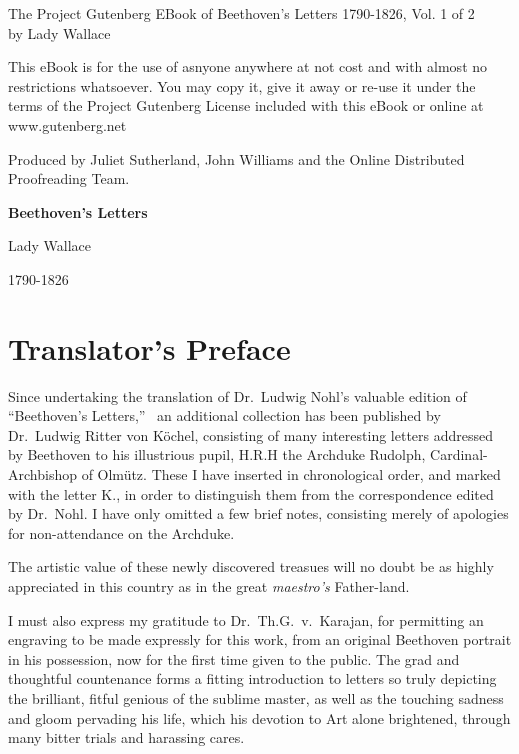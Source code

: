 \documentclass[12pt,oneside]{book}
\begin{document}
    
\frontmatter

\noindent The Project Gutenberg EBook of Beethoven's Letters 1790-1826, Vol. 1 of 2 \\
by Lady Wallace

This eBook is for the use of asnyone anywhere at not cost and with almost no restrictions whatsoever. 
You may copy it, give it away or re-use it under the terms of the Project Gutenberg License included with this eBook or online at www.gutenberg.net

Produced by Juliet Sutherland, John Williams and the Online Distributed Proofreading Team.

\begin{titlepage}
    \centering
    \vspace*{4cm}
    {\Huge \textbf{Beethoven's Letters} \par}
    \vspace{2cm}
    {\LARGE Lady Wallace \par}
    \vspace{1cm}
    {\large 1790-1826 \par }
\end{titlepage}

\chapter{Translator's Preface}
Since undertaking the translation of Dr.~Ludwig Nohl's valuable edition of ``Beethoven's Letters,''~
an additional collection has been published by Dr.~Ludwig Ritter von K\"ochel,
consisting of many interesting letters addressed by Beethoven to his illustrious pupil, H.R.H the Archduke Rudolph,
Cardinal-Archbishop of Olm\"utz.
These I have inserted in chronological order, and marked with the letter K., in order to distinguish them from the correspondence edited by Dr.~Nohl.
I have only omitted a few brief notes, consisting merely of apologies for non-attendance on the Archduke. \par 

The artistic value of these newly discovered treasues will no doubt be as highly appreciated in this country as in the great \textit{maestro's} Father-land. \par 

I must also express my gratitude to Dr.~Th.G.~v.~Karajan,
for permitting an engraving to be made expressly for this work,
from an original Beethoven portrait in his possession,
now for the first time given to the public.
The grad and thoughtful countenance forms a fitting introduction to letters so truly depicting the brilliant, fitful genious of the sublime master, 
as well as the touching sadness and gloom pervading his life,
which his devotion to Art alone brightened,
through many bitter trials and harassing cares. \par 
\end{document}
